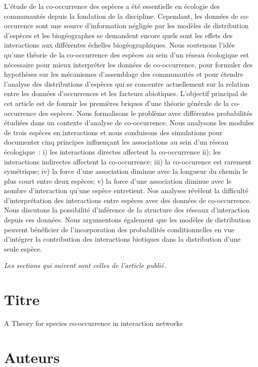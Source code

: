 L'étude de la co-occurrence des espèces a été essentielle en écologie des communautés depuis la fondation de la discipline. Cependant, les données de co-occurence sont une source d'information négligée par les modèles de distribution d'espèces et les biogéographes se demandent encore quels sont les effets des interactions aux différentes échelles biogéographiques. Nous soutenons l'idée qu'une théorie de la co-occurrence des espèces au sein d'un réseau écologique est nécessaire pour mieux interpréter les données de co-occurrence, pour formuler des hypothèses sur les mécanismes d'assemblage des communautés et pour étendre l'analyse des distributions d'espèces qui se concentre actuellement sur la relation entre les données d'occurrences et les facteurs abiotiques. L'objectif principal de cet article est de fournir les premières briques d'une théorie générale de la co-occurrence des espèces. Nous formalisons le problème avec différentes probabilités étudiées dans un contexte d'analyse de co-occurrence. Nous analysons les modules de trois espèces en interactions et nous conduisons des simulations pour documenter cinq principes influençant les associations au sein d'un réseau écologique~: i) les interactions directes affectent la co-occurrence ii); les interactions indirectes affectent la co-occurrence; iii) la co-occurence est rarement symétrique; iv) la force d'une association diminue avec la longueur du chemin le plus court entre deux espèces; v) la force d'une association diminue avec le nombre d'interaction qu'une espèce entretient. Nos analyses révèlent la difficulté d'interprétation des interactions entre espèces avec des données de co-occurrence. Nous discutons la possibilité d'inférence de la structure des réseaux d'interaction depuis ces données. Nous argumentons également que les modèles de distribution peuvent bénéficier de l'incorporation des probabilités conditionnelles en vue d'intégrer la contribution des interactions biotiques dans la distribution d'une seule espèce.


\emph{Les sections qui suivent sont celles de l'article publié.}





\section{Titre}

A Theory for species co-occurrence in interaction networks

\section{Auteurs}

